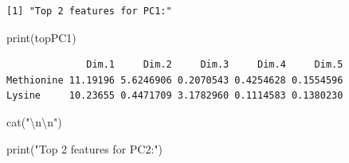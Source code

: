 \documentclass[
  letterpaper,
  DIV=11,
  numbers=noendperiod]{scrartcl}
\newenvironment{Shaded}{\begin{snugshade}}{\end{snugshade}}
\newcommand{\CommentTok}[1]{\textcolor[rgb]{0.37,0.37,0.37}{#1}}
\newcommand{\DecValTok}[1]{\textcolor[rgb]{0.68,0.00,0.00}{#1}}
\newcommand{\FunctionTok}[1]{\textcolor[rgb]{0.28,0.35,0.67}{#1}}
\newcommand{\NormalTok}[1]{\textcolor[rgb]{0.00,0.23,0.31}{#1}}
\newcommand{\OtherTok}[1]{\textcolor[rgb]{0.00,0.23,0.31}{#1}}
\newcommand{\SpecialCharTok}[1]{\textcolor[rgb]{0.37,0.37,0.37}{#1}}
\newcommand{\StringTok}[1]{\textcolor[rgb]{0.13,0.47,0.30}{#1}}
\begin{document}
\begin{Shaded}
\end{Shaded}

\begin{verbatim}
[1] "Top 2 features for PC1:"
\end{verbatim}

\begin{Shaded}
\begin{Highlighting}[]
\FunctionTok{print}\NormalTok{(topPC1)}
\end{Highlighting}
\end{Shaded}

\begin{verbatim}
              Dim.1     Dim.2     Dim.3     Dim.4     Dim.5
Methionine 11.19196 5.6246906 0.2070543 0.4254628 0.1554596
Lysine     10.23655 0.4471709 3.1782960 0.1114583 0.1380230
\end{verbatim}

\begin{Shaded}
\begin{Highlighting}[]
\FunctionTok{cat}\NormalTok{(}\StringTok{"}\SpecialCharTok{\textbackslash{}n\textbackslash{}n}\StringTok{"}\NormalTok{)}
\end{Highlighting}
\end{Shaded}

\begin{Shaded}
\begin{Highlighting}[]
\FunctionTok{print}\NormalTok{(}\StringTok{"Top 2 features for PC2:"}\NormalTok{)}
\end{Highlighting}
\end{Shaded}
\end{document}
